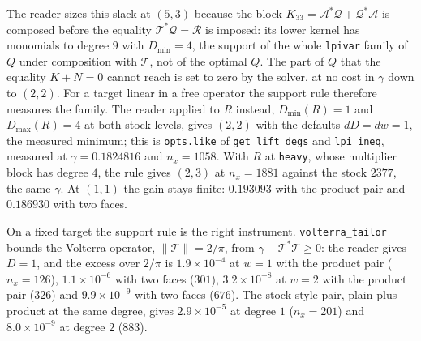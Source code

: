 \documentclass[12pt]{article}
\newcommand{\mcl}[1]{\mathcal{#1}}
\newcommand{\code}[1]{\texttt{#1}}
\theoremstyle{plain}
\theoremstyle{definition}
\theoremstyle{remark}
\begin{document}
The reader sizes this slack at $(5,3)$ because the block $K_{33}=\mcl A^*\mcl Q+\mcl Q^*\mcl A$ is composed before the equality $\mcl T^*\mcl Q=\mcl R$ is imposed: its lower kernel has monomials to degree $9$ with $D_{\min}=4$, the support of the whole \code{lpivar} family of $Q$ under composition with $\mcl T$, not of the optimal $Q$. The part of $Q$ that the equality $K+N=0$ cannot reach is set to zero by the solver, at no cost in $\gamma$ down to $(2,2)$. For a target linear in a free operator the support rule therefore measures the family. The reader applied to $R$ instead, $D_{\min}(R)=1$ and $D_{\max}(R)=4$ at both stock levels, gives $(2,2)$ with the defaults $dD=dw=1$, the measured minimum; this is \code{opts.like} of \code{get\_lift\_degs} and \code{lpi\_ineq}, measured at $\gamma=0.1824816$ and $n_x=1058$. With $R$ at \code{heavy}, whose multiplier block has degree $4$, the rule gives $(2,3)$ at $n_x=1881$ against the stock $2377$, the same $\gamma$. At $(1,1)$ the gain stays finite: $0.193093$ with the product pair and $0.186930$ with two faces.

On a fixed target the support rule is the right instrument. \code{volterra\_tailor} bounds the Volterra operator, $\|\mcl T\|=2/\pi$, from $\gamma-\mcl T^*\mcl T\ge0$: the reader gives $D=1$, and the excess over $2/\pi$ is $1.9\times10^{-4}$ at $w=1$ with the product pair ($n_x=126$), $1.1\times10^{-6}$ with two faces ($301$), $3.2\times10^{-8}$ at $w=2$ with the product pair ($326$) and $9.9\times10^{-9}$ with two faces ($676$). The stock-style pair, plain plus product at the same degree, gives $2.9\times10^{-5}$ at degree $1$ ($n_x=201$) and $8.0\times10^{-9}$ at degree $2$ ($883$).
\end{document}
